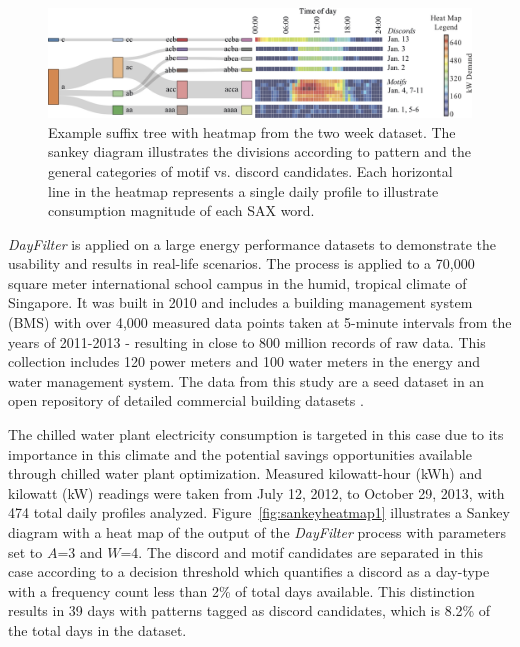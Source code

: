\begin{figure}[ht!]
\begin{center}
\includegraphics[width=1\columnwidth]{figures/DiscordSankeyExampleWithHeatmapV2/DiscordSankeyExampleWithHeatmapV2}
\caption{Example suffix tree with heatmap from the two week dataset. The sankey diagram illustrates the divisions according to pattern and the general categories of motif vs. discord candidates. Each horizontal line in the heatmap represents a single daily profile to illustrate consumption magnitude of each SAX word. \citep{miller_automated_2015}
\label{fig:saxdiscordsankeyheatmap}%
}
\end{center}
\end{figure}

\emph{DayFilter} is applied on a large energy performance datasets to demonstrate the usability and results in real-life scenarios. The process is applied to a 70,000 square meter international school campus in the humid, tropical climate of Singapore. It was built in 2010 and includes a building management system (BMS) with over 4,000 measured data points taken at 5-minute intervals from the years of 2011-2013 - resulting in close to 800 million records of raw data. This collection includes 120 power meters and 100 water meters in the energy and water management system. The data from this study are a seed dataset in an open repository of detailed commercial building datasets \citep{miller_seed_2014}. 

The chilled water plant electricity consumption is targeted in this case due to its importance in this climate and the potential savings opportunities available through chilled water plant optimization. Measured kilowatt-hour (kWh) and kilowatt (kW) readings were taken from July 12, 2012, to October 29, 2013, with 474 total daily profiles analyzed. Figure~\ref{fig:sankeyheatmap1} illustrates a Sankey diagram with a heat map of the output of the \emph{DayFilter} process with parameters set to $A$=3 and $W$=4. The discord and motif candidates are separated in this case according to a decision threshold which quantifies a discord as a day-type with a frequency count less than 2\% of total days available. This distinction results in 39 days with patterns tagged as discord candidates, which is 8.2\% of the total days in the dataset. 

